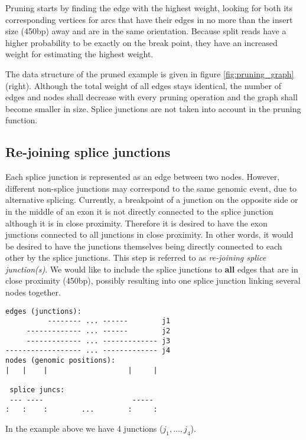 \documentclass{article}
\theoremstyle{definition}
\begin{document}
Pruning starts by finding the edge with the highest weight, looking for both its corresponding vertices for arcs that have their edges in no more than the insert size (450bp) away and are in the same orientation.
Because split reads have a higher probability to be exactly on the break point, they have an increased weight for estimating the highest weight.

The data structure of the pruned example is given in figure \ref{fig:pruning_graph} (right).
Although the total weight of all edges stays identical, the number of edges and nodes shall decrease with every pruning operation and the graph shall become smaller in size.
Splice junctions are not taken into account in the pruning function.

\clearpage

\subsection{Re-joining splice junctions}
%

Each splice junction is represented as an edge between two nodes.
However, different non-splice junctions may correspond to the same genomic event, due to alternative splicing.
Currently, a breakpoint of a junction on the opposite side or in the middle of an exon it is not directly connected to the splice junction although it is in close proximity.
Therefore it is desired to have the exon junctions connected to all junctions in close proximity.
In other words, it would be desired to have the junctions themselves being directly connected to each other by the splice junctions.
This step is referred to as \textit{re-joining splice junction(s)}.
We would like to include the splice junctions to \textbf{all} edges that are in close proximity (450bp), possibly resulting into one splice junction linking several nodes together.

\begin{verbatim}
edges (junctions):
          -------- ... ------        j1
     ------------- ... ------        j2
     ------------- ... ------------- j3
------------------ ... ------------- j4
nodes (genomic positions):
|   |    |                   |     |

 splice juncs:
 --- ----                     -----
:   :    :        ...        :     :
\end{verbatim}
In the example above we have 4 junctions ($j_1,\ldots,j_4$).
\end{document}
